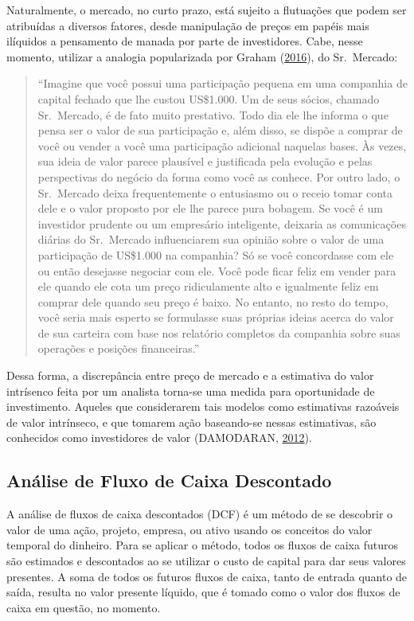 \documentclass[grad,numbers]{coppe}
\begin{document}
  Naturalmente, o mercado, no curto prazo, está sujeito a flutuações que podem ser atribuídas a diversos fatores, desde manipulação de preços em papéis mais ilíquidos a pensamento de manada por parte de investidores. Cabe, nesse momento, utilizar a analogia popularizada por Graham (\protect\hyperlink{ref-graham2016}{2016}), do Sr.~Mercado:
  \begin{quote}
  ``Imagine que você possui uma participação pequena em uma companhia de capital fechado que lhe custou US\$1.000. Um de seus sócios, chamado Sr.~Mercado, é de fato muito prestativo. Todo dia ele lhe informa o que pensa ser o valor de sua participação e, além disso, se dispõe a comprar de você ou vender a você uma participação adicional naquelas bases. Às vezes, sua ideia de valor parece plausível e justificada pela evolução e pelas perspectivas do negócio da forma como você as conhece. Por outro lado, o Sr.~Mercado deixa frequentemente o entusiasmo ou o receio tomar conta dele e o valor proposto por ele lhe parece pura bobagem.
  Se você é um investidor prudente ou um empresário inteligente, deixaria as comunicações diárias do Sr.~Mercado influenciarem sua opinião sobre o valor de uma participação de US\$1.000 na companhia? Só se você concordasse com ele ou então desejasse negociar com ele. Você pode ficar feliz em vender para ele quando ele cota um preço ridiculamente alto e igualmente feliz em comprar dele quando seu preço é baixo. No entanto, no resto do tempo, você seria mais esperto se formulasse suas próprias ideias acerca do valor de sua carteira com base nos relatório completos da companhia sobre suas operações e posições financeiras.''
  \end{quote}
  Dessa forma, a discrepância entre preço de mercado e a estimativa do valor intrísenco feita por um analista torna-se uma medida para oportunidade de investimento. Aqueles que considerarem tais modelos como estimativas razoáveis de valor intrínseco, e que tomarem ação baseando-se nessas estimativas, são conhecidos como investidores de valor (DAMODARAN, \protect\hyperlink{ref-damodaran2012}{2012}).

  \hypertarget{anuxe1lise-de-fluxo-de-caixa-descontado}{%
  \subsection{Análise de Fluxo de Caixa Descontado}\label{anuxe1lise-de-fluxo-de-caixa-descontado}}

  A análise de fluxos de caixa descontados (DCF) é um método de se descobrir o valor de uma ação, projeto, empresa, ou ativo usando os conceitos do valor temporal do dinheiro. Para se aplicar o método, todos os fluxos de caixa futuros são estimados e descontados ao se utilizar o custo de capital para dar seus valores presentes. A soma de todos os futuros fluxos de caixa, tanto de entrada quanto de saída, resulta no valor presente líquido, que é tomado como o valor dos fluxos de caixa em questão, no momento.
\end{document}
